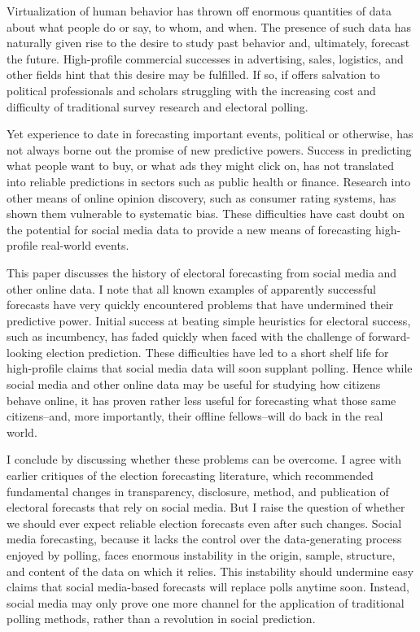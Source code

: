 \documentclass{article}
\begin{document}
Virtualization of human behavior has thrown off enormous quantities of
data about what people do or say, to whom, and when. The presence of
such data has naturally given rise to the desire to study past behavior and,
ultimately, forecast the future. High-profile commercial successes in
advertising, sales, logistics, and other fields hint that this desire
may be fulfilled. If so, if offers salvation to political
professionals and scholars struggling with the increasing cost and
difficulty of traditional survey research and electoral polling.

Yet experience to date in forecasting important events, political or
otherwise, has not always borne out the promise of new predictive
powers. Success in predicting what people want to buy, or what ads
they might click on, has not translated into reliable predictions in
sectors such as public health or finance. Research into other means of
online opinion discovery, such as consumer rating systems, has shown
them vulnerable to systematic bias. These difficulties have cast doubt
on the potential for social media data to provide a new means of
forecasting high-profile real-world events. 

This paper discusses the history of electoral forecasting from social
media and other online data. I note that all
known examples of apparently successful forecasts have very quickly
encountered problems that have undermined their predictive
power. Initial success at beating simple heuristics for electoral
success, such as incumbency, has faded quickly when faced with the
challenge of forward-looking election prediction. These difficulties have led to a short
shelf life for  high-profile claims that social media data
will soon supplant polling. Hence while
social media and other online data may be useful for studying how
citizens behave online, it has proven rather less useful for
forecasting what those same citizens--and, more importantly, their
offline fellows--will do back in the real world.

I conclude by discussing whether these problems can be overcome. I
agree with earlier critiques of the election forecasting literature, which
recommended fundamental changes in transparency, disclosure, method, and
publication of electoral forecasts that rely on social media. But I
raise the question of whether we should ever expect reliable election
forecasts even after such changes. Social media forecasting, because
it lacks the control over the data-generating process enjoyed by
polling, faces enormous instability in the origin, sample, structure,
and content of the data on which it relies. This instability should
undermine easy claims that social media-based forecasts will replace
polls anytime soon. Instead, social media may only prove one more
channel for the application of traditional polling methods, rather
than a revolution in social prediction. 
\end{document}
